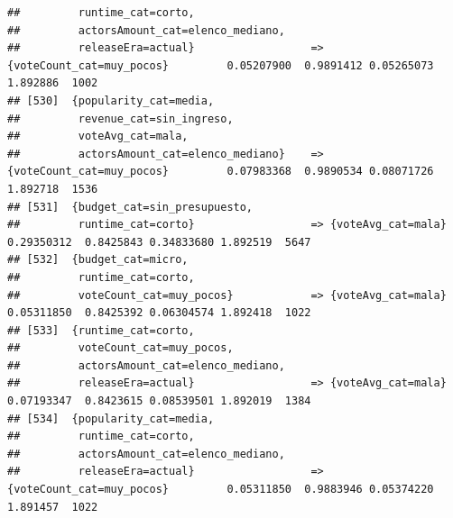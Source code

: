 \documentclass[
]{article}
\begin{document}
\begin{verbatim}
##         runtime_cat=corto,                                                                                                      
##         actorsAmount_cat=elenco_mediano,                                                                                        
##         releaseEra=actual}                  => {voteCount_cat=muy_pocos}         0.05207900  0.9891412 0.05265073 1.892886  1002
## [530]  {popularity_cat=media,                                                                                                   
##         revenue_cat=sin_ingreso,                                                                                                
##         voteAvg_cat=mala,                                                                                                       
##         actorsAmount_cat=elenco_mediano}    => {voteCount_cat=muy_pocos}         0.07983368  0.9890534 0.08071726 1.892718  1536
## [531]  {budget_cat=sin_presupuesto,                                                                                             
##         runtime_cat=corto}                  => {voteAvg_cat=mala}                0.29350312  0.8425843 0.34833680 1.892519  5647
## [532]  {budget_cat=micro,                                                                                                       
##         runtime_cat=corto,                                                                                                      
##         voteCount_cat=muy_pocos}            => {voteAvg_cat=mala}                0.05311850  0.8425392 0.06304574 1.892418  1022
## [533]  {runtime_cat=corto,                                                                                                      
##         voteCount_cat=muy_pocos,                                                                                                
##         actorsAmount_cat=elenco_mediano,                                                                                        
##         releaseEra=actual}                  => {voteAvg_cat=mala}                0.07193347  0.8423615 0.08539501 1.892019  1384
## [534]  {popularity_cat=media,                                                                                                   
##         runtime_cat=corto,                                                                                                      
##         actorsAmount_cat=elenco_mediano,                                                                                        
##         releaseEra=actual}                  => {voteCount_cat=muy_pocos}         0.05311850  0.9883946 0.05374220 1.891457  1022

\end{verbatim}
\end{document}

